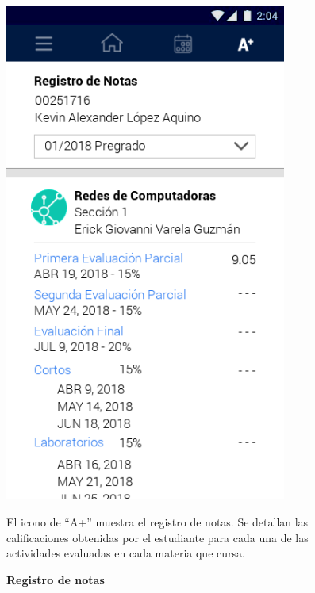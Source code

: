 \documentclass[12pt]{article}
\begin{document}
\begin{figure}[t]
	\begin{minipage}[t]{0.45\textwidth}
		\centering
		\caption{\textbf{Registro de notas}}
		\label{fig:consultaNotas}
		\includegraphics[width=0.825\textwidth]{img/6.png}
	\end{minipage}\hfill
	\begin{minipage}[t]{0.45\textwidth}
		\vspace*{10mm}
		El icono de “A+” muestra el registro de notas. Se detallan las calificaciones obtenidas por el estudiante para cada una de las actividades evaluadas en cada materia que cursa.
	\end{minipage}
\end{figure}
\end{document}
